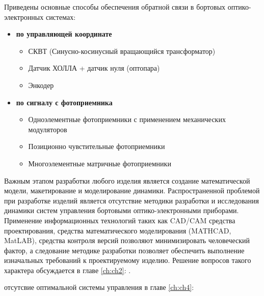 Приведены основные способы обеспечения обратной связи в бортовых оптико-электронных системах:
\begin{itemize}
	\item \textbf{по управляющей координате}
	
	\begin{itemize}
		\item СКВТ (Синусно-косинусный вращающийся трансформатор)
		\item Датчик ХОЛЛА + датчик нуля (оптопара)
		\item Энкодер
	\end{itemize}
		
	\item \textbf{по сигналу с фотоприемника}
	
	\begin{itemize}
		\item Одноэлементные фотоприемники с применением механических модуляторов
		\item Позиционно чувстительные фотоприемники		
		\item Многоэлементные матричные фотоприемники	
	\end{itemize}
	
	
\end{itemize}


Важным этапом разработки любого изделия является создание математической модели, макетирование и моделирование динамики. Распространенной проблемой при разработке изделий является отсутствие методики разработки и исследования динамики систем управления бортовыми оптико-электронными приборами. Применение информационных технологий таких как CAD/CAM средства проектирования, средства математического моделирования (MATHCAD, MatLAB), средства контроля версий позволяют минимизировать человеческий фактор, а следование методике разработки позволяет обеспечить выполнение изначальных требований к проектируемому изделию. Решение вопросов такого характера обсуждается в главе \ref{ch:ch2}: .


отсутсвие оптимальной системы управления
в главе \ref{ch:ch4}: 

 
